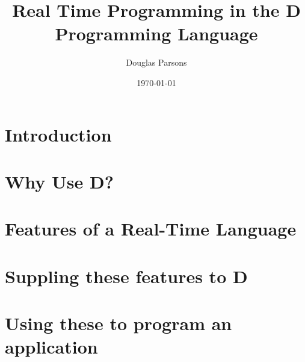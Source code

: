 \documentclass[a4paper, 11pt]{article}
\title{Real Time Programming in the D Programming Language}
\author{Douglas Parsons}
\date{\today}
\begin{document}
\maketitle
%
\section{Introduction}

\section{Why Use D?}

\section{Features of a Real-Time Language}

\section{Suppling these features to D}

\section{Using these to program an application}
%
%
%
\end{document}
